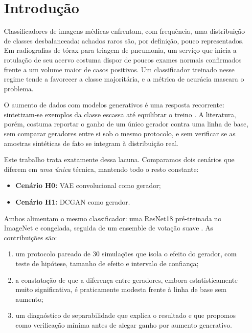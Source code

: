\documentclass[conference]{IEEEtran}
\begin{document}
\section{Introdução}

Classificadores de imagens médicas enfrentam, com frequência, uma distribuição
de classes desbalanceada: achados raros são, por definição, pouco
representados. Em radiografias de tórax para triagem de pneumonia, um serviço
que inicia a rotulação de seu acervo costuma dispor de poucos exames normais
confirmados frente a um volume maior de casos positivos. Um classificador
treinado nesse regime tende a favorecer a classe majoritária, e a métrica de
acurácia mascara o problema.

O aumento de dados com modelos generativos é uma resposta recorrente:
sintetizam-se exemplos da classe escassa até equilibrar o treino
\cite{frid2018gan}. A literatura, porém, costuma reportar o ganho de um único
gerador contra uma linha de base, sem comparar geradores entre si sob o mesmo
protocolo, e sem verificar se as amostras sintéticas de fato se integram à
distribuição real.

Este trabalho trata exatamente dessa lacuna. Comparamos dois cenários que
diferem em \emph{uma única} técnica, mantendo todo o resto constante:

\begin{itemize}
  \item \textbf{Cenário H0:} VAE convolucional \cite{kingma2014vae} como gerador;
  \item \textbf{Cenário H1:} DCGAN \cite{radford2016dcgan} como gerador.
\end{itemize}

Ambos alimentam o mesmo classificador: uma ResNet18 \cite{he2016resnet}
pré-treinada no ImageNet e congelada, seguida de um ensemble de votação suave
\cite{dietterich2000ensemble}. As contribuições são:

\begin{enumerate}
  \item um protocolo pareado de 30 simulações que isola o efeito do gerador,
        com teste de hipótese, tamanho de efeito e intervalo de confiança;
  \item a constatação de que a diferença entre geradores, embora
        estatisticamente muito significativa, é praticamente modesta frente à
        linha de base sem aumento;
  \item um diagnóstico de separabilidade que explica o resultado e que
        propomos como verificação mínima antes de alegar ganho por aumento
        generativo.
\end{enumerate}
\end{document}
